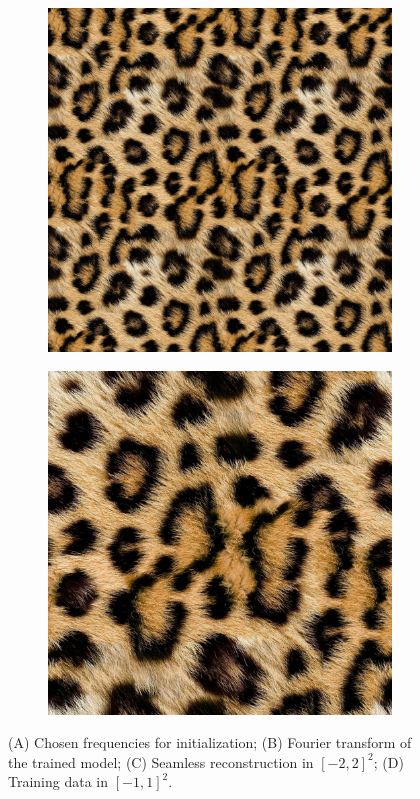 \begin{figure}[!ht]
\begin{subfigure}{0.24\textwidth}
    \caption{} \label{fig:1b}
  \end{subfigure}
  \begin{subfigure}{0.24\textwidth}
    \includegraphics[width=\linewidth]{img/ch6/mnet_extrapolation.png}
    \caption{} \label{fig:1c}
  \end{subfigure}
  \begin{subfigure}{0.24\textwidth}
    \includegraphics[width=\linewidth]{img/ch6/leopard-train-data.png}
    \caption{} \label{fig:1d}
  \end{subfigure}
\caption{(A) Chosen frequencies for initialization; (B) Fourier transform of the trained model; (C) Seamless reconstruction in $[-2, 2]^2$; (D) Training data in $[-1, 1]^2$.}
\label{f:tileable_leopard_comparison_siren}
\end{figure}

